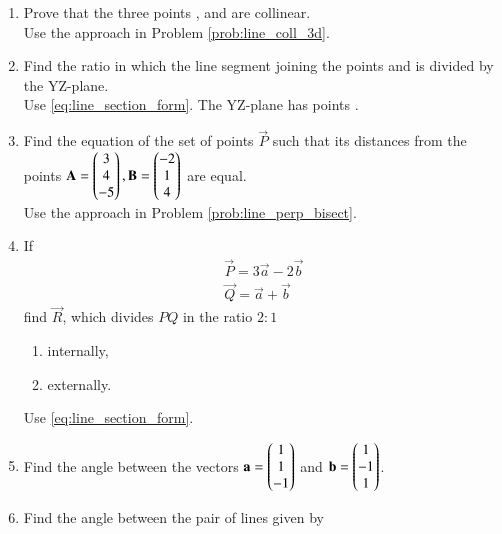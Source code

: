 \begin{enumerate}[label=\arabic*.,ref=\thesubsection.\theenumi]
\item Prove that the three points ,  and  are collinear.
%
\\
\solution  Use the approach in Problem \ref{prob:line_coll_3d}.
%
\item Find the ratio in which the line segment joining the points  and  is divided by the YZ-plane.
%
\\
\solution Use \eqref{eq:line_section_form}.  The YZ-plane has points .
%
\item Find the equation of the set of points $\vec{P}$ such that its distances from the points
$
\mathbf{A}=\begin{pmatrix}3\\4\\-5\end{pmatrix}, 
\mathbf{B}=\begin{pmatrix}-2\\1\\4\end{pmatrix}
$
are equal. 
%
\\
\solution Use the approach in Problem \ref{prob:line_perp_bisect}.
\item If 
\begin{align}
\vec{P} = 3\vec{a}-2\vec{b}
\\
\vec{Q} = \vec{a}+\vec{b}
\end{align}
%
find $\vec{R}$, which divides $PQ$ in the ratio $2:1$
\begin{enumerate}
\item internally,
\item externally.
\end{enumerate}
%
\solution Use \eqref{eq:line_section_form}.  
\item Find the angle between the vectors 
$\mathbf{a}=\begin{pmatrix}1\\1\\-1\end{pmatrix}$
  and 
$\mathbf{b}=\begin{pmatrix}1\\-1\\1\end{pmatrix}$.
%
\\
\solution 

%
\item Find the angle between the pair of lines given by 

\end{enumerate}
